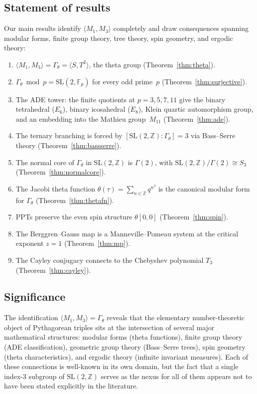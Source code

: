 \documentclass[12pt]{amsart}
\theoremstyle{definition}
\theoremstyle{remark}
\newcommand{\SL}{\mathrm{SL}}
\newcommand{\Fp}{\mathbb{F}_p}
\newcommand{\Z}{\mathbb{Z}}
\newcommand{\Gtheta}{\Gamma_\theta}
\begin{document}
\subsection*{Statement of results}
Our main results identify $\langle M_1, M_3\rangle$ completely and draw
consequences spanning modular forms, finite group theory, tree theory,
spin geometry, and ergodic theory:

\begin{enumerate}[label=(\roman*)]
\item $\langle M_1, M_3\rangle = \Gtheta = \langle S, T^2\rangle$,
the theta group (Theorem~\ref{thm:theta}).
\item $\Gtheta \bmod p = \SL(2,\Fp)$ for every odd prime~$p$
(Theorem~\ref{thm:surjective}).
\item The ADE tower: the finite quotients at $p=3,5,7,11$ give the
binary tetrahedral ($E_6$), binary icosahedral ($E_8$), Klein quartic
automorphism group, and an embedding into the Mathieu group~$M_{11}$
(Theorem~\ref{thm:ade}).
\item The ternary branching is forced by $[\SL(2,\Z):\Gtheta]=3$ via
Bass--Serre theory (Theorem~\ref{thm:bassserre}).
\item The normal core of $\Gtheta$ in $\SL(2,\Z)$ is $\Gamma(2)$, with
$\SL(2,\Z)/\Gamma(2) \cong S_3$ (Theorem~\ref{thm:normalcore}).
\item The Jacobi theta function $\theta(\tau) = \sum_{n\in\Z} q^{n^2}$
is the canonical modular form for $\Gtheta$ (Theorem~\ref{thm:thetafn}).
\item PPTs preserve the even spin structure $\theta[0,0]$
(Theorem~\ref{thm:spin}).
\item The Berggren--Gauss map is a Manneville--Pomeau system at the
critical exponent $z=1$ (Theorem~\ref{thm:mp}).
\item The Cayley conjugacy connects to the Chebyshev polynomial $T_3$
(Theorem~\ref{thm:cayley}).
\end{enumerate}

\subsection*{Significance}
The identification $\langle M_1, M_3\rangle = \Gtheta$ reveals that the
elementary number-theoretic object of Pythagorean triples sits at the
intersection of several major mathematical structures: modular forms
(theta functions), finite group theory (ADE classification), geometric
group theory (Bass--Serre trees), spin geometry (theta characteristics),
and ergodic theory (infinite invariant measures).  Each of these
connections is well-known in its own domain, but the fact that a single
index-3 subgroup of $\SL(2,\Z)$ serves as the nexus for all of them
appears not to have been stated explicitly in the literature.
\end{document}
